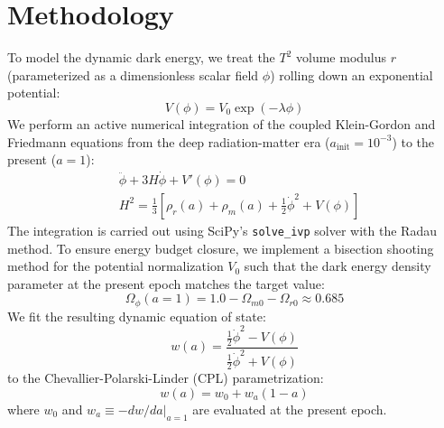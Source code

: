 \documentclass[12pt]{article}
\begin{document}
\section{Methodology}
To model the dynamic dark energy, we treat the $T^2$ volume modulus $r$ (parameterized as a dimensionless scalar field $\phi$) rolling down an exponential potential:
\begin{equation}
V(\phi) = V_0 \exp(- \lambda \phi)
\end{equation}
We perform an active numerical integration of the coupled Klein-Gordon and Friedmann equations from the deep radiation-matter era ($a_{\text{init}} = 10^{-3}$) to the present ($a = 1$):
\begin{align}
&\ddot{\phi} + 3H\dot{\phi} + V'(\phi) = 0 \\
&H^2 = \frac{1}{3} \left[ \rho_r(a) + \rho_m(a) + \frac{1}{2}\dot{\phi}^2 + V(\phi) \right]
\end{align}
The integration is carried out using SciPy's \texttt{solve\_ivp} solver with the Radau method. To ensure energy budget closure, we implement a bisection shooting method for the potential normalization $V_0$ such that the dark energy density parameter at the present epoch matches the target value:
\begin{equation}
\Omega_\phi(a=1) = 1.0 - \Omega_{m0} - \Omega_{r0} \approx 0.685
\end{equation}
We fit the resulting dynamic equation of state:
\begin{equation}
w(a) = \frac{\frac{1}{2}\dot{\phi}^2 - V(\phi)}{\frac{1}{2}\dot{\phi}^2 + V(\phi)}
\end{equation}
to the Chevallier-Polarski-Linder (CPL) parametrization:
\begin{equation}
w(a) = w_0 + w_a(1-a)
\end{equation}
where $w_0$ and $w_a \equiv -dw/da|_{a=1}$ are evaluated at the present epoch.
\end{document}
